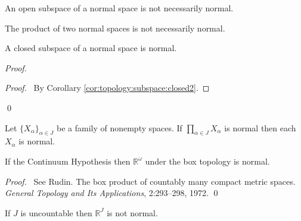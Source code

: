 \begin{cor}
 An open subspace of a normal space is not necessarily normal.
\end{cor}

\begin{cor}
 The product of two normal spaces is not necessarily normal.
\end{cor}

\begin{prop}
 A closed subspace of a normal space is normal.
\end{prop}

\begin{proof}
 \pf
 \begin{proof}
   \pf\ By Corollary \ref{cor:topology:subspace:closed2}.
 \end{proof}
 \qed
\end{proof}

\begin{cor}
  Let $\{X_\alpha\}_{\alpha \in J}$ be a family of nonempty spaces. If
  $\prod_{\alpha \in J} X_\alpha$ is normal then each $X_\alpha$ is normal.
\end{cor}

  \begin{prop}
  If the Continuum Hypothesis then $\mathbb{R}^\omega$ under the box topology
  is normal.
\end{prop}

\begin{proof}
  \pf\ See Rudin. The box product of countably many compact metric spaces.
  \emph{General Topology and Its Applications}, 2:293--298, 1972. \qed
\end{proof}

  \begin{prop}[Stone (DC)]
    \label{prop:topology:normal:uncountable}
  If $J$ is uncountable then $\mathbb{R}^J$ is not normal.
\end{prop}

